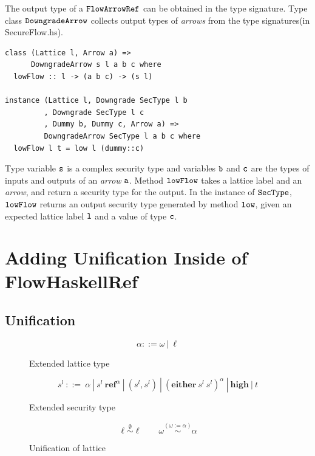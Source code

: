 \documentclass{report}
\newcommand{\co}[1]{$\cod{#1}$}
\newcommand{\st}{s^l}
\begin{document}
The output type of a \co{FlowArrowRef} can be obtained in the type signature. 
Type class \co{DowngradeArrow} collects output types of {\em arrows} from
the type signatures(in SecureFlow.hs).
\begin{Verbatim}[fontsize=\small]
class (Lattice l, Arrow a) =>
      DowngradeArrow s l a b c where
  lowFlow :: l -> (a b c) -> (s l)

instance (Lattice l, Downgrade SecType l b
         , Downgrade SecType l c
         , Dummy b, Dummy c, Arrow a) =>
         DowngradeArrow SecType l a b c where
  lowFlow l t = low l (dummy::c)
\end{Verbatim}
Type variable \co{s} is a complex security type and variables \co{b} and \co{c} are the types of 
inputs and outputs of an {\em arrow} \co{a}.
Method \co{lowFlow} takes a lattice label and an {\em arrow}, and return a security type for the output.
In the instance of \co{SecType}, \co{lowFlow} returns an output security
type generated by method \co{low}, given an expected lattice label \co{l} and a value of type \co{c}.


\chapter{Adding Unification Inside of FlowHaskellRef }


\section{Unification}
\label{chap4:unification}

\newcommand{\unify}[1]{\stackrel{{#1}}{\sim}}
\newcommand{\ct}{c^l}

\begin{figure}[t]
\[
\alpha ::= \omega\ |\ \ell
\]
\caption{Extended lattice type}
\label{fig:unif:lt}
\end{figure}

\begin{figure}[t]
\[
\st\ ::=\ \alpha\ |\ \st\ \mathbf{ref}^{\alpha}\ |\ (\st,\st)\ |\ (\mathbf{either}\ \st\ \st)^{\alpha}\ 
        |\ \mathbf{high}\ |\ t
\]
\caption{Extended security type}
\label{fig:unif:st}
\end{figure}

\begin{figure}[t]
\[
\ell\unify{\emptyset} \ell\quad \quad \omega\unify{(\omega:=\alpha)} \alpha
\]
\caption{Unification of lattice}
\label{fig:unif:ul}
\end{figure}
\end{document}

